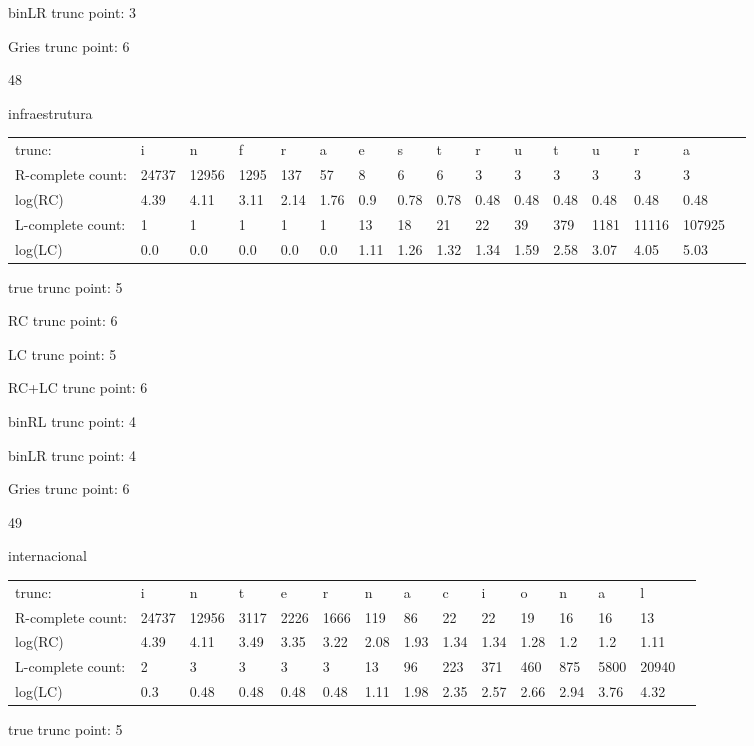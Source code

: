 \documentclass[10pt]{article}
\begin{document}
binLR trunc point: 3

Gries trunc point: 6

\vspace{1em}

48

infraestrutura

\begin{tabular}{l|lllllllllllllll}
trunc: & i & n & f & r & a & e & s & t & r & u & t & u & r & a & \\ 
R-complete count: & 24737 & 12956 & 1295 & 137 & 57 & 8 & 6 & 6 & 3 & 3 & 3 & 3 & 3 & 3 & \\ 
log(RC) & 4.39 & 4.11 & 3.11 & 2.14 & 1.76 & 0.9 & 0.78 & 0.78 & 0.48 & 0.48 & 0.48 & 0.48 & 0.48 & 0.48 & \\ 
L-complete count: & 1 & 1 & 1 & 1 & 1 & 13 & 18 & 21 & 22 & 39 & 379 & 1181 & 11116 & 107925 & \\ 
log(LC) & 0.0 & 0.0 & 0.0 & 0.0 & 0.0 & 1.11 & 1.26 & 1.32 & 1.34 & 1.59 & 2.58 & 3.07 & 4.05 & 5.03 & \\ 
\end{tabular}

true trunc point: 5

RC trunc point: 6

LC trunc point: 5

RC+LC trunc point: 6

binRL trunc point: 4

binLR trunc point: 4

Gries trunc point: 6

\newpage

49

internacional

\begin{tabular}{l|llllllllllllll}
trunc: & i & n & t & e & r & n & a & c & i & o & n & a & l & \\ 
R-complete count: & 24737 & 12956 & 3117 & 2226 & 1666 & 119 & 86 & 22 & 22 & 19 & 16 & 16 & 13 & \\ 
log(RC) & 4.39 & 4.11 & 3.49 & 3.35 & 3.22 & 2.08 & 1.93 & 1.34 & 1.34 & 1.28 & 1.2 & 1.2 & 1.11 & \\ 
L-complete count: & 2 & 3 & 3 & 3 & 3 & 13 & 96 & 223 & 371 & 460 & 875 & 5800 & 20940 & \\ 
log(LC) & 0.3 & 0.48 & 0.48 & 0.48 & 0.48 & 1.11 & 1.98 & 2.35 & 2.57 & 2.66 & 2.94 & 3.76 & 4.32 & \\ 
\end{tabular}

true trunc point: 5
\end{document}
